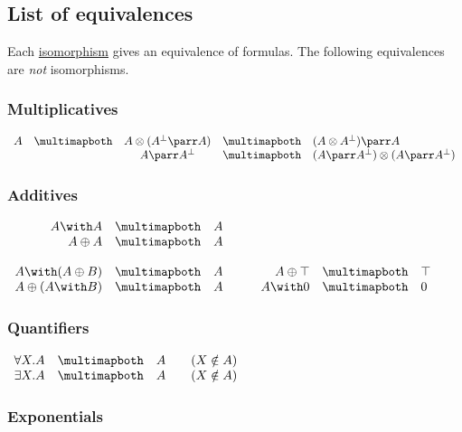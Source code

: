\subsection{List of equivalences}\label{list-of-equivalences}

Each \hyperref[list-of-isomorphisms]{isomorphism} gives an equivalence of
formulas. The following equivalences are \emph{not} isomorphisms.

\subsubsection{Multiplicatives}\label{multiplicatives-1}

\(\begin{array}{rcccl}
A & \linequiv&  A \tens (A\orth\parr A) & \linequiv&  (A\tens A\orth)\parr A \\
&  &  A\parr A\orth & \linequiv&  (A\parr A\orth)\tens(A\parr A\orth)
\end{array}\)

\subsubsection{Additives}\label{additives-1}

\(\begin{array}{rclcrcl}
A \with A & \linequiv&  A \\
A \plus A & \linequiv&  A \\
\\
  A \with (A \plus B) & \linequiv&  A & \quad&  A \plus \top & \linequiv&  \top \\
  A \plus (A \with B) & \linequiv&  A & \quad&  A \with \zero & \linequiv&  \zero
\end{array}\)

\subsubsection{Quantifiers}\label{quantifiers}

\(\begin{array}{rcll}
  \forall X.A & \linequiv&  A & \quad (X\notin A) \\
  \exists X.A & \linequiv&  A & \quad (X\notin A)
\end{array}\)

\subsubsection{Exponentials}\label{exponentials-2}

